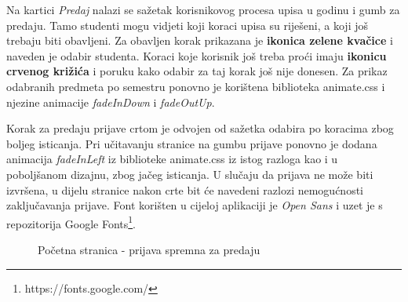 \documentclass[times, utf8, zavrsni, numeric]{fer}
\begin{document}
    Na kartici \textit{Predaj} nalazi se sažetak korisnikovog procesa upisa u godinu i gumb za predaju. Tamo studenti mogu vidjeti koji koraci upisa su riješeni, a koji još trebaju biti obavljeni. Za obavljen korak prikazana je \textbf{ikonica zelene kvačice} i naveden je odabir studenta. Koraci koje korisnik još treba proći imaju \textbf{ikonicu crvenog križića} i poruku kako odabir za taj korak još nije donesen. Za prikaz odabranih predmeta po semestru ponovno je korištena biblioteka animate.css i njezine animacije \textit{fadeInDown} i \textit{fadeOutUp}.
    
    Korak za predaju prijave crtom je odvojen od sažetka odabira po koracima zbog boljeg isticanja. Pri učitavanju stranice na gumbu prijave ponovno je dodana animacija \textit{fadeInLeft} iz biblioteke animate.css iz istog razloga kao i u poboljšanom dizajnu, zbog jačeg isticanja. U slučaju da prijava ne može biti izvršena, u dijelu stranice nakon crte bit će navedeni razlozi nemogućnosti zaključavanja prijave. Font korišten u cijeloj aplikaciji je \textit{Open Sans} i uzet je s repozitorija Google Fonts\footnote{https://fonts.google.com/}.
    
    \begin{figure} [H]
      \centering
      \caption{Početna stranica - prijava spremna za predaju}
    \end{figure}
    
\end{document}
